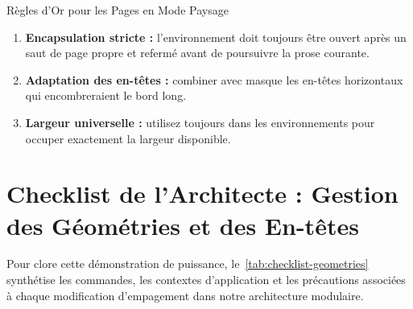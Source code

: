 \begin{landscape}
\vspace{-2mm}

\begin{boiteSynthese}{Règles d'Or pour les Pages en Mode Paysage}
\footnotesize
\begin{enumerate}[nosep]
  \item \textbf{Encapsulation stricte :} l'environnement  doit toujours être ouvert après un saut de page propre et refermé avant de poursuivre la prose courante.
  \item \textbf{Adaptation des en-têtes :} combiner  avec  masque les en-têtes horizontaux qui encombreraient le bord long.
  \item \textbf{Largeur universelle :} utilisez toujours  dans les environnements  pour occuper exactement la largeur disponible.
\end{enumerate}
\end{boiteSynthese}

\end{landscape}
\activerStyleStandard

\section{Checklist de l'Architecte : Gestion des Géométries et des En-têtes}
\label{sec:checklist-geometrie}

Pour clore cette démonstration de puissance, le~\cref{tab:checklist-geometries} synthétise
les commandes, les contextes d'application et les précautions associées
à chaque modification d'empagement dans notre architecture modulaire.

